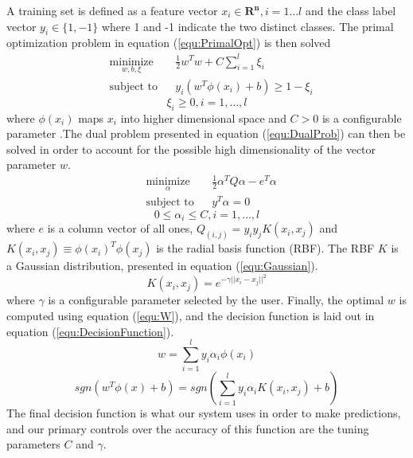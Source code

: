 A training set is defined as a feature vector $x_i \in \mathbf{R^n}  ,i=1\ldots{l}$ and the class label vector $y_i \in \lbrace 1,-1 \rbrace $ where 1 and -1 indicate the two distinct classes. The primal optimization problem in equation (\ref{equ:PrimalOpt}) is then solved
\begin{equation}
\begin{aligned}
\label{equ:PrimalOpt}
& \underset{w,b,\xi}{\text{minimize}}
& & \frac{1}{2}w^Tw+C\sum_{i=1}^{l} \xi_i \\
& \text{subject to}
& &  y_i(w^T\phi(x_i) + b) \ge 1 - \xi_i
\end{aligned}
\end{equation}
\[ \xi_i \ge 0, i = 1,\ldots ,l \]
where $\phi (x_i)$ maps $x_i$ into higher dimensional space and $C > 0$ is a configurable parameter \cite{LibSVM}.The dual problem presented in equation (\ref{equ:DualProb}) can then be solved in order to account for the possible high dimensionality of the vector parameter $w$.
\begin{equation}
\begin{aligned}
\label{equ:DualProb}
& \underset{\alpha}{\text{minimize}}
& & \frac{1}{2}\alpha^TQ\alpha-e^T\alpha \\
& \text{subject to}
& &  y^T\alpha = 0
\end{aligned}
\end{equation}
\[ 0 \le \alpha_i \le C, i = 1,\ldots ,l \]
where $e$ is a column vector of all ones, $Q_(i,j)=y_i y_j K(x_i,x_j)$ and $K(x_i,x_j ) \equiv \phi (x_i )^T \phi (x_j)$ is the radial basis function (RBF). The RBF $K$ is a Gaussian distribution, presented in equation (\ref{equ:Gaussian}).
\begin{equation}
\label{equ:Gaussian}
K(x_i, x_j) = e^{-\gamma ||x_i - x_j||^{2}}
\end{equation}
where $\gamma$ is a configurable parameter selected by the user. Finally, the optimal $w$ is computed using equation (\ref{equ:W}), and the decision function is laid out in equation (\ref{equ:DecisionFunction}).
\begin{equation}
\label{equ:W}
w = \sum_{i=1}^{l} y_i \alpha_i \phi (x_i)
\end{equation}
\begin{equation}
\label{equ:DecisionFunction}
sgn(w^T\phi (x) + b) = sgn(\sum_{i=1}^{l} y_i\alpha_i K(x_i, x_j) +b)
\end{equation}
The final decision function is what our system uses in order to make predictions, and our primary controls over the accuracy of this function are the tuning parameters $C$ and $\gamma$.

